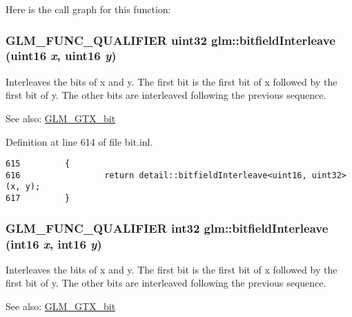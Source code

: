 Here is the call graph for this function:\hypertarget{group__gtx__bit_g19ef8360379483e3ee245e89cb62ff93}{
\subsubsection[bitfieldInterleave]{\setlength{\rightskip}{0pt plus 5cm}GLM\_\-FUNC\_\-QUALIFIER uint32 glm::bitfieldInterleave (uint16 {\em x}, \/  uint16 {\em y})}}
\label{group__gtx__bit_g19ef8360379483e3ee245e89cb62ff93}


Interleaves the bits of x and y. The first bit is the first bit of x followed by the first bit of y. The other bits are interleaved following the previous sequence.

\begin{Desc}
\item[See also:]\hyperlink{group__gtx__bit}{GLM\_\-GTX\_\-bit} \end{Desc}


Definition at line 614 of file bit.inl.

\begin{Code}\begin{verbatim}615         {
616                 return detail::bitfieldInterleave<uint16, uint32>(x, y);
617         }
\end{verbatim}
\end{Code}


\hypertarget{group__gtx__bit_g1a0264598647ae00a596865af4e1e878}{
\subsubsection[bitfieldInterleave]{\setlength{\rightskip}{0pt plus 5cm}GLM\_\-FUNC\_\-QUALIFIER int32 glm::bitfieldInterleave (int16 {\em x}, \/  int16 {\em y})}}
\label{group__gtx__bit_g1a0264598647ae00a596865af4e1e878}


Interleaves the bits of x and y. The first bit is the first bit of x followed by the first bit of y. The other bits are interleaved following the previous sequence.

\begin{Desc}
\item[See also:]\hyperlink{group__gtx__bit}{GLM\_\-GTX\_\-bit} \end{Desc}


